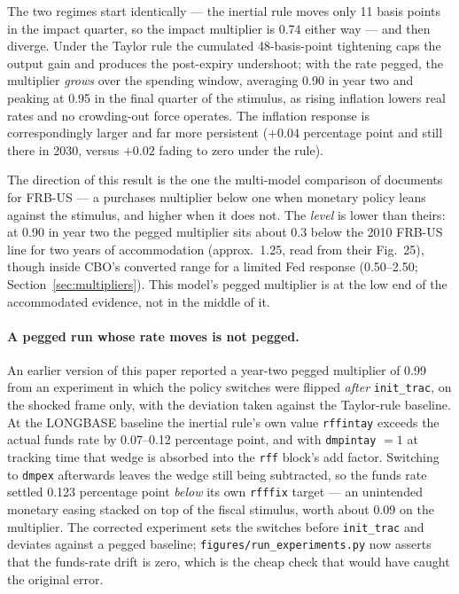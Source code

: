 The two regimes start identically --- the inertial rule moves only 11 basis points in the impact quarter, so the impact multiplier is 0.74 either way --- and then diverge. Under the Taylor rule the cumulated 48-basis-point tightening caps the output gain and produces the post-expiry undershoot; with the rate pegged, the multiplier \emph{grows} over the spending window, averaging 0.90 in year two and peaking at 0.95 in the final quarter of the stimulus, as rising inflation lowers real rates and no crowding-out force operates. The inflation response is correspondingly larger and far more persistent ($+0.04$ percentage point and still there in 2030, versus $+0.02$ fading to zero under the rule).

The direction of this result is the one the multi-model comparison of \citet{coenen2012effects} documents for FRB-US --- a purchases multiplier below one when monetary policy leans against the stimulus, and higher when it does not. The \emph{level} is lower than theirs: at 0.90 in year two the pegged multiplier sits about 0.3 below the 2010 FRB-US line for two years of accommodation (approx.\ 1.25, read from their Fig.~25), though inside CBO's converted range for a limited Fed response (0.50--2.50; Section~\ref{sec:multipliers}). This model's pegged multiplier is at the low end of the accommodated evidence, not in the middle of it.

\paragraph{A pegged run whose rate moves is not pegged.} An earlier version of this paper reported a year-two pegged multiplier of 0.99 from an experiment in which the policy switches were flipped \emph{after} \texttt{init\_trac}, on the shocked frame only, with the deviation taken against the Taylor-rule baseline. At the LONGBASE baseline the inertial rule's own value \texttt{rffintay} exceeds the actual funds rate by 0.07--0.12 percentage point, and with \texttt{dmpintay} $=1$ at tracking time that wedge is absorbed into the \texttt{rff} block's add factor. Switching to \texttt{dmpex} afterwards leaves the wedge still being subtracted, so the funds rate settled 0.123 percentage point \emph{below} its own \texttt{rfffix} target --- an unintended monetary easing stacked on top of the fiscal stimulus, worth about 0.09 on the multiplier. The corrected experiment sets the switches before \texttt{init\_trac} and deviates against a pegged baseline; \texttt{figures/run\_experiments.py} now asserts that the funds-rate drift is zero, which is the cheap check that would have caught the original error.

